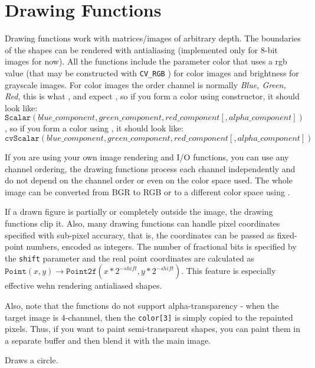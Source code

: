 \section{Drawing Functions}

Drawing functions work with matrices/images of arbitrary depth.
The boundaries of the shapes can be rendered with antialiasing (implemented only for 8-bit images for now).
All the functions include the parameter color that uses a rgb value (that may be constructed
with \texttt{CV\_RGB} 
) for color
images and brightness for grayscale images. For color images the order channel
is normally \emph{Blue, Green, Red}, this is what ,  and  expect
\ifCpp
, so if you form a color using  constructor, it should look like:
\[\texttt{Scalar}(blue\_component, green\_component, red\_component[, alpha\_component])\]
\fi
\ifC
, so if you form a color using , it should look like:
\[\texttt{cvScalar}(blue\_component, green\_component, red\_component[, alpha\_component])\]
\fi

If you are using your own image rendering and I/O functions, you can use any channel ordering, the drawing functions process each channel independently and do not depend on the channel order or even on the color space used. The whole image can be converted from BGR to RGB or to a different color space using .

If a drawn figure is partially or completely outside the image, the drawing functions clip it. Also, many drawing functions can handle pixel coordinates specified with sub-pixel accuracy, that is, the coordinates can be passed as fixed-point numbers, encoded as integers. The number of fractional bits is specified by the \texttt{shift} parameter and the real point coordinates are calculated as $\texttt{Point}(x,y)\rightarrow\texttt{Point2f}(x*2^{-shift},y*2^{-shift})$. This feature is especially effective wehn rendering antialiased shapes.

Also, note that the functions do not support alpha-transparency - when the target image is 4-channnel, then the \texttt{color[3]} is simply copied to the repainted pixels. Thus, if you want to paint semi-transparent shapes, you can paint them in a separate buffer and then blend it with the main image.

\ifCPy

Draws a circle.

